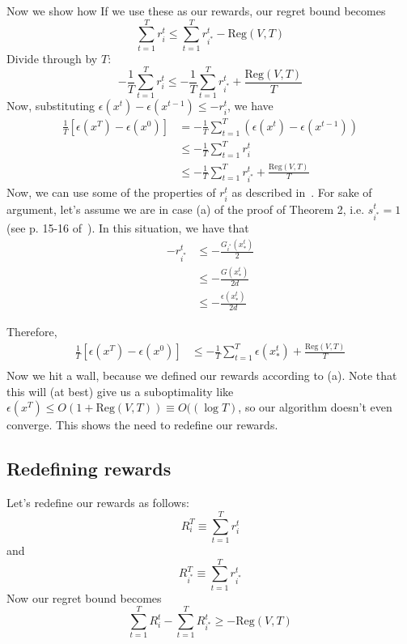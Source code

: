 \documentclass[letterpaper]{article}
\newcommand{\istar}{i^*}
\begin{document}
Now we show how If we use these as our rewards, our regret bound becomes
\begin{equation}
    \sum_{t=1}^T r_i^t \leq \sum_{t=1}^T r_{\istar}^t - \text{Reg}(V,T)
\end{equation}
Divide through by $T$: 
\begin{equation}
    -\frac{1}{T} \sum_{t=1}^T r_i^t \leq -\frac{1}{T}\sum_{t=1}^T r_{\istar}^t + \frac{\text{Reg}(V,T)}{T}
\end{equation}
Now, substituting $\epsilon(x^t) - \epsilon(x^{t-1}) \leq -r_i^t$, we have
\begin{align}
    \frac{1}{T}\left[\epsilon(x^T) - \epsilon(x^0)\right]&= -\frac{1}{T}\sum_{t=1}^T\left(\epsilon(x^t) - \epsilon(x^{t-1})\right)\\
    &\leq -\frac{1}{T} \sum_{t=1}^T r_i^t \\
    &\leq -\frac{1}{T}\sum_{t=1}^T r_{\istar}^t + \frac{\text{Reg}(V,T)}{T}
\end{align}
Now, we can use some of the properties of $r_i^t$ as described in~\cite{salehi2018coordinate}. For sake of argument, let's assume we are in case (a) of the proof of Theorem 2, i.e. $s_{\istar}^t = 1$ (see p. 15-16 of~\cite{salehi2018coordinate}). In this situation, we have that
\begin{align}
    -r_{\istar}^t &\leq -\frac{G_{\istar}(x^t_*)}{2} \\
    &\leq -\frac{G(x^t_*)}{2d} \\
    &\leq -\frac{\epsilon(x^t_*)}{2d}
\end{align}

Therefore,
\begin{align}
    \frac{1}{T}\left[\epsilon(x^T) - \epsilon(x^0)\right] &\leq -\frac{1}{T}\sum_{t=1}^T \epsilon(x^t_*) + \frac{\text{Reg}(V,T)}{T} \\
\end{align}
Now we hit a wall, because we defined our rewards according to (a). Note that this will (at best) give us a suboptimality like $\epsilon(x^T) \leq O\left(1 + \text{Reg}(V,T)\right)\equiv O((\log T)$, so our algorithm doesn't even converge. This shows the need to redefine our rewards.

\subsection{Redefining rewards}
\label{section:proxy_rewards}

Let's redefine our rewards as follows:
\begin{equation}
    R_i^T \equiv \sum_{t=1}^T r_i^t
\end{equation}
and
\begin{equation}
    R_{\istar}^T \equiv \sum_{t=1}^T r_{\istar}^t
\end{equation}
Now our regret bound becomes
\begin{equation}
    \sum_{t=1}^T R_i^t -\sum_{t=1}^T R_{\istar}^t \geq -\text{Reg}(V,T)
\end{equation}
\end{document}
